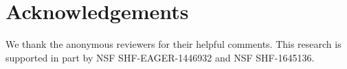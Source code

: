 \documentclass[conference]{IEEEtran}
\begin{document}
\begin{abstract}
%

\end{abstract}




















\balance
\iftrue
\section*{Acknowledgements}
We thank the anonymous reviewers for their helpful comments. %
This research is supported in part by NSF SHF-EAGER-1446932 and NSF SHF-1645136.
\fi



\end{document}
